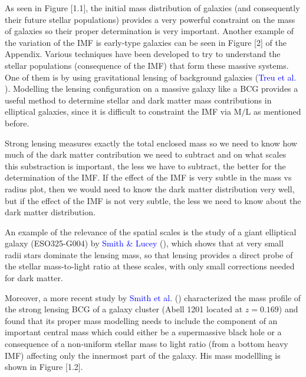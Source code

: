 As seen in Figure [1.1], the initial mass distribution of galaxies (and consequently their future stellar populations) provides a very powerful constraint on the mass of galaxies so their proper determination is very important. Another example of the variation of the IMF is early-type galaxies can be seen in Figure [2] of the Appendix. Various techniques have been developed to try to understand the stellar populations (consequence of the IMF) that form these massive systems. One of them is by using gravitational lensing  of  background galaxies (\textcolor{blue}{Treu et al.} \citeyear{Reference1}). Modelling the lensing configuration on a massive galaxy like a BCG provides a useful method to determine stellar and dark matter mass contributions in elliptical galaxies, since it is difficult to constraint the IMF via $\textrm{M}/\text{L}$ as mentioned before. 

Strong lensing measures exactly the total enclosed mass so we need to know how much of the dark matter contribution we need to subtract and on what scales this substraction is important, the less we have to subtract, the better for the determination of the IMF. If the effect of the IMF is very subtle in the mass vs radius plot, then we would need to know the dark matter distribution very well, but if the effect of the IMF is not very subtle, the less we need to know about the dark matter distribution. 

An example of the relevance of the spatial scales is the study of a giant elliptical galaxy (ESO325-G004) by \textcolor{blue}{Smith \& Lucey} (\citeyear{Reference7}), which shows that at very small radii stars dominate the lensing mass, so that lensing provides a direct probe of the stellar mass-to-light ratio at these scales, with only small corrections needed for dark matter.  

Moreover, a more recent study by \textcolor{blue}{Smith et al.} (\citeyear{Reference34}) characterized the mass profile of the strong lensing BCG of a galaxy cluster (Abell 1201 located at $z=0.169$) and found that its proper mass modelling needs to include the component of an important central mass which could either be a supermassive black hole or a consequence of a non-uniform stellar mass to light ratio (from a bottom heavy IMF) affecting only the innermost part of the galaxy. His mass modellling is shown in Figure [1.2].

